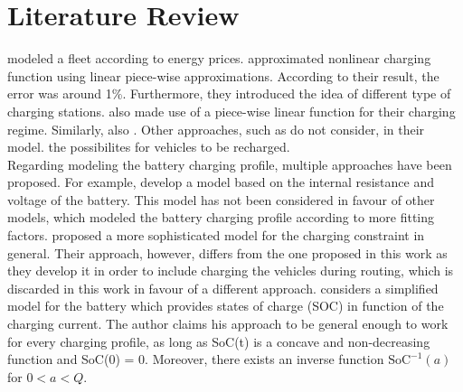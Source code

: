 \chapter{Literature Review}\label{ch:related_work}
 modeled a fleet according to energy prices.  approximated nonlinear charging function using linear piece-wise approximations. According to their result, the error was around 1\%. Furthermore, they introduced the idea of different type of charging stations.  also made use of a piece-wise linear function for their charging regime. Similarly, also . Other approaches, such as  do not consider, in their model. the possibilites for vehicles to be recharged.\\
Regarding modeling the battery charging profile, multiple approaches have been proposed. For example,  develop a model based on the internal resistance and voltage of the battery. This model has not been considered in favour of other models, which modeled the battery charging profile according to more fitting factors.  proposed a more sophisticated model for the charging constraint in general. Their approach, however, differs from the one proposed in this work as they develop it in order to include charging the vehicles during routing, which is discarded in this work in favour of a different approach.  considers a simplified model for the battery which provides states of charge (SOC) in function of the charging current. The author claims his approach to be general enough to work for every charging profile, as long as SoC(t) is a concave and non-decreasing function and SoC(0) = 0. Moreover, there exists an inverse function $\text{SoC}^{-1}(a)$ for $0 < a < Q$.\\

